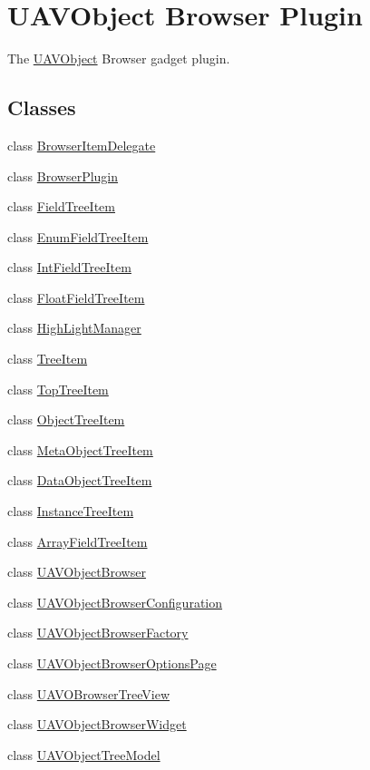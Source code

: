 \hypertarget{group___u_a_v_object_browser_plugin}{\section{\-U\-A\-V\-Object \-Browser \-Plugin}
\label{group___u_a_v_object_browser_plugin}
}


\-The \hyperlink{class_u_a_v_object}{\-U\-A\-V\-Object} \-Browser gadget plugin.  


\subsection*{\-Classes}
\begin{DoxyCompactItemize}
\item 
class \hyperlink{class_browser_item_delegate}{\-Browser\-Item\-Delegate}
\item 
class \hyperlink{class_browser_plugin}{\-Browser\-Plugin}
\item 
class \hyperlink{class_field_tree_item}{\-Field\-Tree\-Item}
\item 
class \hyperlink{class_enum_field_tree_item}{\-Enum\-Field\-Tree\-Item}
\item 
class \hyperlink{class_int_field_tree_item}{\-Int\-Field\-Tree\-Item}
\item 
class \hyperlink{class_float_field_tree_item}{\-Float\-Field\-Tree\-Item}
\item 
class \hyperlink{class_high_light_manager}{\-High\-Light\-Manager}
\item 
class \hyperlink{class_tree_item}{\-Tree\-Item}
\item 
class \hyperlink{class_top_tree_item}{\-Top\-Tree\-Item}
\item 
class \hyperlink{class_object_tree_item}{\-Object\-Tree\-Item}
\item 
class \hyperlink{class_meta_object_tree_item}{\-Meta\-Object\-Tree\-Item}
\item 
class \hyperlink{class_data_object_tree_item}{\-Data\-Object\-Tree\-Item}
\item 
class \hyperlink{class_instance_tree_item}{\-Instance\-Tree\-Item}
\item 
class \hyperlink{class_array_field_tree_item}{\-Array\-Field\-Tree\-Item}
\item 
class \hyperlink{class_u_a_v_object_browser}{\-U\-A\-V\-Object\-Browser}
\item 
class \hyperlink{class_u_a_v_object_browser_configuration}{\-U\-A\-V\-Object\-Browser\-Configuration}
\item 
class \hyperlink{class_u_a_v_object_browser_factory}{\-U\-A\-V\-Object\-Browser\-Factory}
\item 
class \hyperlink{class_u_a_v_object_browser_options_page}{\-U\-A\-V\-Object\-Browser\-Options\-Page}
\item 
class \hyperlink{class_u_a_v_o_browser_tree_view}{\-U\-A\-V\-O\-Browser\-Tree\-View}
\item 
class \hyperlink{class_u_a_v_object_browser_widget}{\-U\-A\-V\-Object\-Browser\-Widget}
\item 
class \hyperlink{class_u_a_v_object_tree_model}{\-U\-A\-V\-Object\-Tree\-Model}
\end{DoxyCompactItemize}

